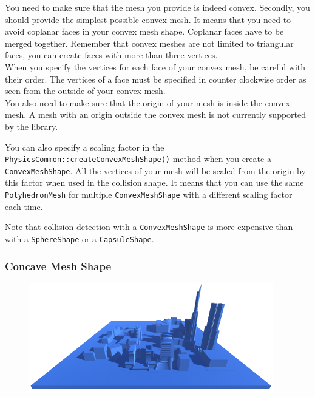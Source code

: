 \documentclass[a4paper,12pt]{article}
\begin{document}
    You need to make sure that the mesh you provide is indeed convex. Secondly, you should provide the simplest possible convex mesh. It means
    that you need to avoid coplanar faces in your convex mesh shape. Coplanar faces have to be merged together. Remember that convex meshes are
    not limited to triangular faces, you can create faces with more than three vertices. \\

    When you specify the vertices for each face of your convex mesh, be careful with their order. The vertices of a face must be specified in
    counter clockwise order as seen from the outside of your convex mesh. \\

    You also need to make sure that the origin of your mesh is inside the convex mesh. A mesh with an origin outside the
    convex mesh is not currently supported by the library. \\

    \begin{sloppypar}
    You can also specify a scaling factor in the \texttt{PhysicsCommon::createConvexMeshShape()} method when you create a
    \texttt{Convex\allowbreak MeshShape}. All the vertices of your mesh
    will be scaled from the origin by this factor when used in the collision shape. It means that you can use the same \texttt{PolyhedronMesh} for
    multiple \texttt{ConvexMeshShape} with a different scaling factor each time. \\
    \end{sloppypar}

    Note that collision detection with a \texttt{ConvexMeshShape} is more expensive than with a \texttt{SphereShape} or a \texttt{CapsuleShape}. \\

  \subsubsection{Concave Mesh Shape}

  \begin{figure}[h]
      \centering
      \includegraphics{concavemeshshape.png}
      \label{fig:concaveshape}
  \end{figure}
\end{document}
